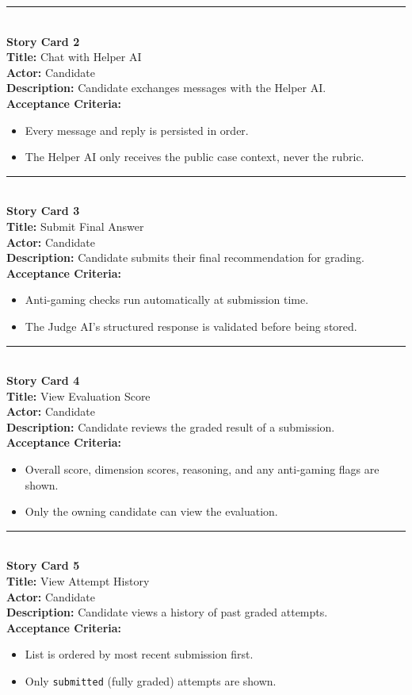 \documentclass[11pt]{article}
\begin{document}
\noindent\rule{\linewidth}{0.5pt}\\
\textbf{Story Card 2}\\
\textbf{Title:} Chat with Helper AI\\
\textbf{Actor:} Candidate\\
\textbf{Description:} Candidate exchanges messages with the Helper AI.\\
\textbf{Acceptance Criteria:}
\begin{itemize}[nosep]
  \item Every message and reply is persisted in order.
  \item The Helper AI only receives the public case context, never the rubric.
\end{itemize}

\noindent\rule{\linewidth}{0.5pt}\\
\textbf{Story Card 3}\\
\textbf{Title:} Submit Final Answer\\
\textbf{Actor:} Candidate\\
\textbf{Description:} Candidate submits their final recommendation for grading.\\
\textbf{Acceptance Criteria:}
\begin{itemize}[nosep]
  \item Anti-gaming checks run automatically at submission time.
  \item The Judge AI's structured response is validated before being stored.
\end{itemize}

\noindent\rule{\linewidth}{0.5pt}\\
\textbf{Story Card 4}\\
\textbf{Title:} View Evaluation Score\\
\textbf{Actor:} Candidate\\
\textbf{Description:} Candidate reviews the graded result of a submission.\\
\textbf{Acceptance Criteria:}
\begin{itemize}[nosep]
  \item Overall score, dimension scores, reasoning, and any anti-gaming flags are shown.
  \item Only the owning candidate can view the evaluation.
\end{itemize}

\noindent\rule{\linewidth}{0.5pt}\\
\textbf{Story Card 5}\\
\textbf{Title:} View Attempt History\\
\textbf{Actor:} Candidate\\
\textbf{Description:} Candidate views a history of past graded attempts.\\
\textbf{Acceptance Criteria:}
\begin{itemize}[nosep]
  \item List is ordered by most recent submission first.
  \item Only \texttt{submitted} (fully graded) attempts are shown.
\end{itemize}
\end{document}
